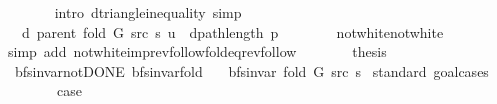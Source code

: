 \begin{isabellebody}
\ \ \ \ \ \ \isamarkupfalse%
\ {\isacharparenleft}{\kern0pt}intro\ d{\isacharunderscore}{\kern0pt}triangle{\isacharunderscore}{\kern0pt}inequality{\isacharparenright}{\kern0pt}\ simp{\isacharplus}{\kern0pt}\isanewline
\ \ \ \ \isamarkupfalse%
\ \isamarkupfalse%
\ {\isachardoublequoteopen}{\isachardot}{\kern0pt}{\isachardot}{\kern0pt}{\isachardot}{\kern0pt}\ {\isacharequal}{\kern0pt}\ d\ {\isacharparenleft}{\kern0pt}parent\ {\isacharparenleft}{\kern0pt}fold\ G\ src\ s{\isacharparenright}{\kern0pt}{\isacharparenright}{\kern0pt}\ u\ {\isacharplus}{\kern0pt}\ dpath{\isacharunderscore}{\kern0pt}length\ p{\isachardoublequoteclose}\isanewline
\ \ \ \ \ \ \isamarkupfalse%
\ not{\isacharunderscore}{\kern0pt}white{\isacharunderscore}{\kern0pt}not{\isacharunderscore}{\kern0pt}white\isanewline
\ \ \ \ \ \ \isamarkupfalse%
\ {\isacharparenleft}{\kern0pt}simp\ add{\isacharcolon}{\kern0pt}\ not{\isacharunderscore}{\kern0pt}white{\isacharunderscore}{\kern0pt}imp{\isacharunderscore}{\kern0pt}rev{\isacharunderscore}{\kern0pt}follow{\isacharunderscore}{\kern0pt}fold{\isacharunderscore}{\kern0pt}eq{\isacharunderscore}{\kern0pt}rev{\isacharunderscore}{\kern0pt}follow{\isacharparenright}{\kern0pt}\isanewline
\ \ \ \ \isamarkupfalse%
\ \isamarkupfalse%
\ {\isacharquery}{\kern0pt}thesis\isanewline
\ \ \ \ \ \ \isacommand{{\isachardot}{\kern0pt}}\isamarkupfalse%
\isanewline
\ \ \isamarkupfalse%
\isanewline
{}\isamarkupfalse%
%
\endisatagproof
{\isafoldproof}%
%
\isadelimproof
\isanewline
%
\endisadelimproof
\isanewline
{}\isamarkupfalse%
\ {\isacharparenleft}{\kern0pt}\ bfs{\isacharunderscore}{\kern0pt}invar{\isacharunderscore}{\kern0pt}not{\isacharunderscore}{\kern0pt}DONE{\isacharparenright}{\kern0pt}\ bfs{\isacharunderscore}{\kern0pt}invar{\isacharunderscore}{\kern0pt}fold{\isacharcolon}{\kern0pt}\isanewline
\ \ \ {\isachardoublequoteopen}bfs{\isacharunderscore}{\kern0pt}invar{\isacharprime}{\kern0pt}{\isacharprime}{\kern0pt}\ {\isacharparenleft}{\kern0pt}fold\ G\ src\ s{\isacharparenright}{\kern0pt}{\isachardoublequoteclose}\isanewline
%
\isadelimproof
%
\endisadelimproof
%
\isatagproof
{}\isamarkupfalse%
\ {\isacharparenleft}{\kern0pt}standard{\isacharcomma}{\kern0pt}\ goal{\isacharunderscore}{\kern0pt}cases{\isacharparenright}{\kern0pt}\isanewline
\ \ \isamarkupfalse%
\ {}\isanewline
\ \ \isamarkupfalse%
\ {\isacharquery}{\kern0pt}case\ \isamarkupfalse%

\end{isabellebody}
